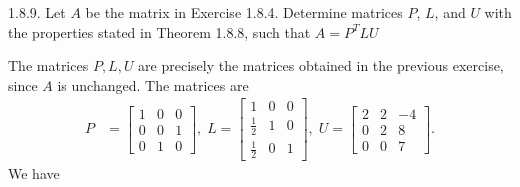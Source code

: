 \documentclass{report}
\begin{document}
    \bigbreak \noindent 
    \begin{mdframed}
        1.8.9. Let $A$ be the matrix in Exercise 1.8.4. Determine matrices $P$, $L$, and $U$ with the properties stated in Theorem 1.8.8, such that $A = P^{T}LU$
    \end{mdframed}
    \bigbreak \noindent 
    The matrices $P,L,U$ are precisely the matrices obtained in the previous exercise, since $A$ is unchanged. The matrices are
    \begin{align*}
        P &= \begin{bmatrix}
            1 & 0 & 0 \\
            0 & 0 & 1 \\
            0 & 1 & 0
        \end{bmatrix},\;
        L = \begin{bmatrix}
            1 & 0 & 0 \\
            \frac{1}{2} & 1 & 0 \\
            \frac{1}{2} & 0  & 1
        \end{bmatrix},\;
        U = 
        \begin{bmatrix}
            2 & 2 & -4 \\
            0 & 2 & 8 \\
            0 & 0 & 7
        \end{bmatrix}
    .\end{align*}
    We have
\end{document}
